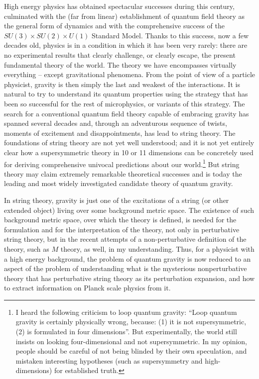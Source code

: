 High energy physics has obtained spectacular successes during this 
century, culminated with the (far from linear) establishment of 
quantum field theory as the general form of dynamics and with the 
comprehensive success of the $SU(3)\times SU(2)\times U(1)$ Standard 
Model.  Thanks to this success, now a few decades old, physics is in a 
condition in which it has been very rarely: there are no experimental 
results that clearly challenge, or clearly escape, the present 
fundamental theory of the world.  The theory we have encompasses 
virtually everything -- except gravitational phenomena.  From the 
point of view of a particle physicist, gravity is then simply the last 
and weakest of the interactions.  It is natural to try to understand 
its quantum properties using the strategy that has been so successful 
for the rest of microphysics, or variants of this strategy.  The 
search for a conventional quantum field theory capable of embracing 
gravity has spanned several decades and, through an adventurous 
sequence of twists, moments of excitement and disappointments, has 
lead to string theory.  The foundations of string theory are not yet 
well understood; and it is not yet entirely clear how a supersymmetric 
theory in 10 or 11 dimensions can be concretely used for deriving 
comprehensive univocal predictions about our world.\footnote{I heard 
the following criticism to loop quantum gravity: ``Loop quantum 
gravity is certainly physically wrong, because: (1) it is not 
supersymmetric, (2) is formulated in four dimensions''.  But 
experimentally, the world still insists on looking four-dimensional 
and not supersymmetric.  In my opinion, people should be careful of 
not being blinded by their own speculation, and mistaken interesting 
hypotheses (such as supersymmetry and high-dimensions) for established 
truth.} But string theory may claim extremely remarkable theoretical 
successes and is today the leading and most widely investigated 
candidate theory of quantum gravity.

In string theory, gravity is just one of the excitations of a string 
(or other extended object) living over some background metric space.  
The existence of such background metric space, over which the theory 
is defined, is needed for the formulation and for the interpretation 
of the theory, not only in perturbative string theory, but in the 
recent attempts of a non-perturbative definition of the theory, such 
as $M$ theory, as well, in my understanding.  Thus, for a physicist 
with a high energy background, the problem of quantum gravity is now 
reduced to an aspect of the problem of understanding what is the 
mysterious nonperturbative theory that has perturbative string theory 
as its perturbation expansion, and how to extract information on 
Planck scale physics from it.

